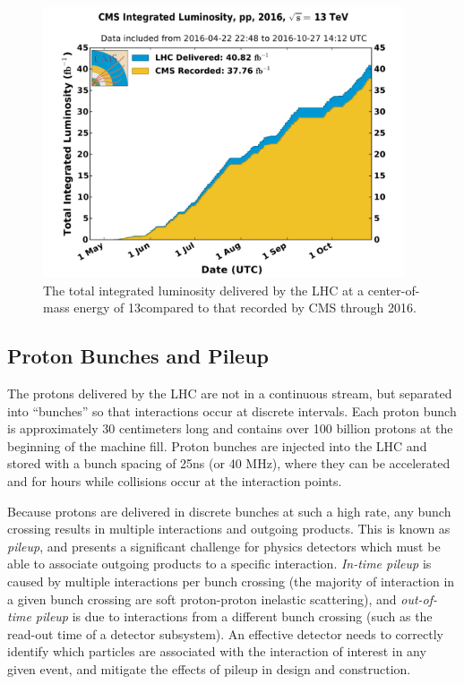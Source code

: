 \begin{figure}
	\centering
	\includegraphics[width=0.95\textwidth]{detector/figs/int_lumi_per_day_cumulative_pp_2016}
	\renewcommand{\baselinestretch}{1.0}
	\caption[The total integrated luminosity delivered by the LHC at a center-of-mass energy of 13\TeV compared to that recorded by CMS through 2016.]{The total integrated luminosity delivered by the LHC at a center-of-mass energy of 13\TeV compared to that recorded by CMS through 2016.}
	\label{fig:lumi}
\end{figure}

\subsection{Proton Bunches and Pileup}
\label{subsec:pileup}

The protons delivered by the LHC are not in a continuous stream, but separated into ``bunches'' so that interactions occur at discrete intervals. Each proton bunch is approximately 30 centimeters long and contains over 100 billion protons at the beginning of the machine fill. Proton bunches are injected into the LHC and stored with a bunch spacing of 25ns (or 40 MHz), where they can be accelerated and for hours while collisions occur at the interaction points.

Because protons are delivered in discrete bunches at such a high rate, any bunch crossing results in multiple interactions and outgoing products. This is known as {\it pileup}, and presents a significant challenge for physics detectors which must be able to associate outgoing products to a specific interaction. {\it In-time pileup} is caused by multiple interactions per bunch crossing (the majority of interaction in a given bunch crossing are soft proton-proton inelastic scattering), and {\it out-of-time pileup} is due to interactions from a different bunch crossing (such as the read-out time of a detector subsystem). An effective detector needs to correctly identify which particles are associated with the interaction of interest in any given event, and mitigate the effects of pileup in design and construction.

